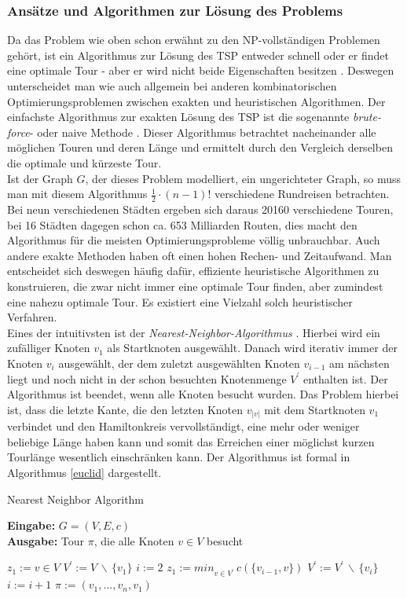 \documentclass[doktyp=barbeit, sprache=german]{TUBAFarbeiten}
\begin{document}
\subsubsection{Ansätze und Algorithmen zur Lösung des Problems}
Da das Problem wie oben schon erwähnt zu den NP-vollständigen Problemen gehört, ist ein Algorithmus zur Lösung des TSP entweder schnell oder er findet eine optimale Tour - aber er wird nicht beide Eigenschaften besitzen \cite{TSP}. Deswegen unterscheidet man wie auch allgemein bei anderen kombinatorischen Optimierungsproblemen zwischen exakten und heuristischen Algorithmen.
Der einfachste Algorithmus zur exakten Lösung des TSP ist die sogenannte \textit{\glqq brute-force\grqq}- oder naive Methode \cite{TaschenbuchAlgorithmen}. Dieser Algorithmus betrachtet nacheinander alle möglichen Touren und deren Länge und ermittelt durch den Vergleich derselben die optimale und kürzeste Tour. 
\\Ist der Graph \(G\), der dieses Problem modelliert, ein ungerichteter Graph, so muss man mit diesem Algorithmus \(\frac{1}{2} \cdot (n - 1)!\) verschiedene Rundreisen betrachten. Bei neun verschiedenen Städten ergeben sich daraus 20160 verschiedene Touren, bei 16 Städten dagegen schon ca. 653 Milliarden Routen, dies macht den Algorithmus für die meisten Optimierungsprobleme völlig unbrauchbar. Auch andere exakte Methoden haben oft einen hohen Rechen- und Zeitaufwand. Man entscheidet sich deswegen häufig dafür, effiziente heuristische Algorithmen zu konstruieren, die zwar nicht immer eine optimale Tour finden, aber zumindest eine nahezu optimale Tour. Es existiert eine Vielzahl solch heuristischer Verfahren.
\\Eines der intuitivsten ist der \textit{Nearest-Neighbor-Algorithmus} \cite{Lotz2014}. Hierbei wird ein zufälliger Knoten $v_1$ als Startknoten ausgewählt. Danach wird iterativ immer der Knoten $v_i$ ausgewählt, der dem zuletzt ausgewählten Knoten $v_{i-1}$ am nächsten liegt und noch nicht in der schon besuchten Knotenmenge $V^\prime$ enthalten ist. Der Algorithmus ist beendet, wenn alle Knoten besucht wurden. Das Problem hierbei ist, dass die letzte Kante, die den letzten Knoten $v_{|v|}$ mit dem Startknoten $v_1$ verbindet und den Hamiltonkreis vervollständigt, eine mehr oder weniger beliebige Länge haben kann und somit das Erreichen einer möglichst kurzen Tourlänge wesentlich einschränken kann. Der Algorithmus ist formal in Algorithmus \ref{euclid} dargestellt.
\begin{algorithm}
\caption{Nearest Neighbor Algorithm}
\label{euclid}
\textbf{Eingabe:} $G = (V,E,c)$
\\\textbf{Ausgabe:} Tour $\pi$, die alle Knoten $v \in V$ besucht
\begin{algorithmic}[1]
\State $z_1 := v \in V$
\State $V^\prime := V \, \backslash \, \{v_1\}$
\State $i := 2$
\State $z_1 := min_{v\in V^\prime}  \, c(\{v_{i-1},v\})$
\State $V^\prime := V^\prime \, \backslash \, \{v_i\}$
\State $i := i +1 $
\EndWhile
\State $\pi := (v_1,...,v_n,v_1)$
\end{algorithmic}
\end{algorithm}
\end{document}
